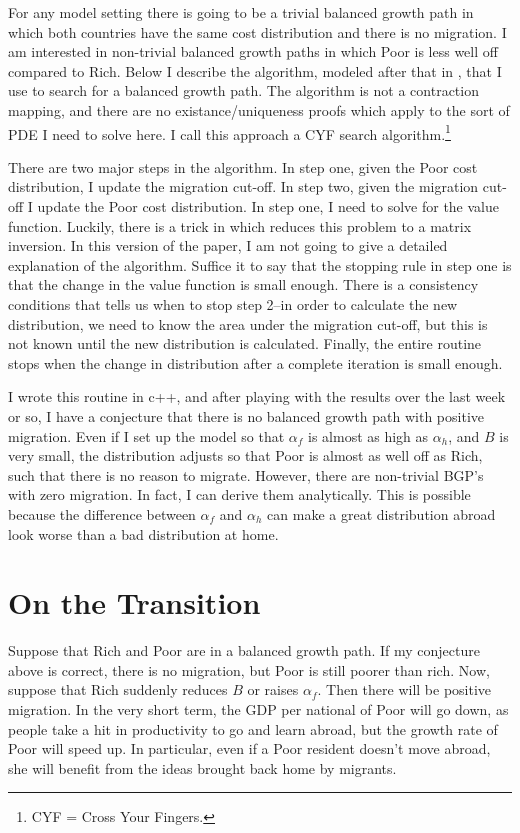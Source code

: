 \documentclass[12pt]{article}
\begin{document}
For any model setting there is going to be a trivial balanced growth path in which both countries have the same cost distribution and there is no migration.  I am interested in non-trivial balanced growth paths in which Poor is less well off compared to Rich.
Below I describe the algorithm, modeled after that in \citet{LucasMoll2012}, that I use to search for a balanced growth path.  The algorithm is not a contraction mapping, and there are no existance/uniqueness proofs which apply to the sort of PDE I need to solve here.  I call this approach a CYF search algorithm.\footnote{CYF = Cross Your Fingers.} 

There are two major steps in the algorithm.  In step one, given the Poor cost distribution, I update the migration cut-off.  In step two, given the migration cut-off I update the Poor cost distribution.  In step one, I need to solve for the value function.  Luckily, there is a trick in \citet{LucasMoll2012} which reduces this problem to a matrix inversion.  In this version of the paper, I am not going to give a detailed explanation of the algorithm.  Suffice it to say that the stopping rule in step one is that the change in the value function is small enough.  There is a consistency conditions that tells us when to stop step 2--in order to calculate the new distribution, we need to know the area under the migration cut-off, but this is not known until the new distribution is calculated.  Finally, the entire routine stops when the change in distribution after a complete iteration is small enough.

I wrote this routine in c++, and after playing with the results over the last week or so, I have a conjecture that there is no balanced growth path with positive migration.  Even if I set up the model so that $\alpha_f$ is almost as high as $\alpha_h$, and $B$ is very small, the distribution adjusts so that Poor is almost as well off as Rich, such that there is no reason to migrate.  However, there are non-trivial BGP's with zero migration.  In fact, I can derive them analytically. This is possible because the difference between $\alpha_f$ and $\alpha_h$ can make a great distribution abroad look worse than a bad distribution at home.
\section{On the Transition}

Suppose that Rich and Poor are in a balanced growth path.  If my conjecture above is correct, there is no migration, but Poor is still poorer than rich.  Now, suppose that Rich suddenly reduces $B$ or raises $\alpha_f$.  Then there will be positive migration.  In the very short term, the GDP per national of Poor will go down, as people take a hit in productivity to go and learn abroad, but the growth rate of Poor will speed up.  In particular, even if a Poor resident doesn't move abroad, she will benefit from the ideas brought back home by migrants.
\end{document}
